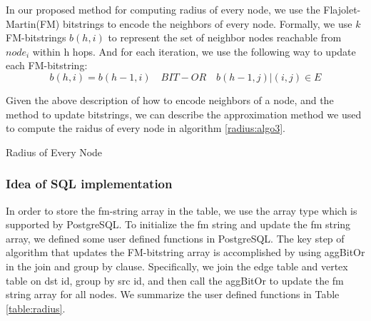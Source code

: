 In our proposed method for computing radius of every node, we use the Flajolet-Martin(FM) bitstrings to encode the neighbors of every node. Formally, we use $k$ FM-bitstrings $b(h, i)$ to represent the set of neighbor nodes reachable from $node_i$ within h hops. And for each iteration, we use the following way to update each FM-bitstring:$$b(h,i) = b(h-1,i)  \quad BIT-OR \quad  {b(h-1,j)|(i,j)\in E}$$

Given the above description of how to encode neighbors of a node, and the method to update bitstrings, we can describe the approximation method we used to compute the raidus of every node in algorithm \ref{radius:algo3}.

\begin{algorithm}
\caption{Radius of Every Node}
\begin{algorithmic}
\REPEAT
{}
\end{algorithmic}
\label{radius:algo3}
\end{algorithm}

\subsubsection{Idea of SQL implementation}
In order to store the fm-string array in the table, we use the array type which is supported by PostgreSQL. To initialize the fm string and update the fm string array, we defined some user defined functions in PostgreSQL. The key step of algorithm that updates the FM-bitstring array is accomplished by using aggBitOr in the join and group by clause. Specifically, we join the edge table and vertex table on dst id, group by src id, and then call the aggBitOr to update the fm string array for all nodes. We summarize the user defined functions in Table \ref{table:radius}.

